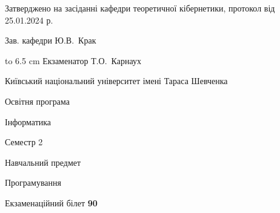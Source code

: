 \documentclass[12pt, ukrainian]{article}
\begin{document}
{\smallskip\smallskip \begin {scriptsize} Затверджено на засіданні кафедри теоретичної кібернетики, протокол   від   25.01.2024 р.\par\smallskip\smallskip\smallskip\smallskip
{\parbox {6.5 cm} {Зав. кафедри \dotfill Ю.В.~Крак}}\hspace {0.7cm} {\hbox to 6.5 cm { Екзаменатор \dotfill Т.О.~Карнаух}} \end{scriptsize}}
\newpage
{{\begin {scriptsize}\par
{ \center  Київський національний університет імені Тараса Шевченка \par}
{\parbox {5 cm}{Освітня програма \hfill}{\parbox {7 cm}{Інформатика\hfill}}\parbox {6 cm}{\hfill Семестр 2}}\par
{\parbox {5 cm} {Навчальний предмет \hfill}\parbox {7 cm}{Програмування \hfill}\parbox {6cm}{\hfill}\par}\vspace{-15pt} \end{scriptsize}}{\center Екзаменаційний білет \No \textbf { 90 }\par}}
\end{document}
